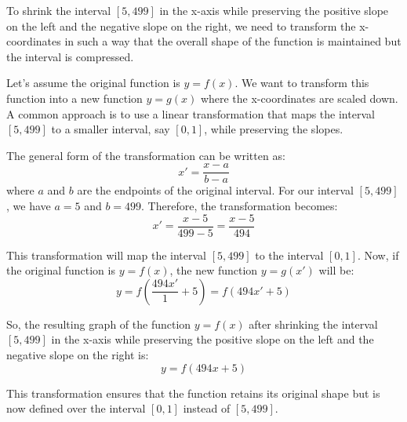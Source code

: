 To shrink the interval \([5, 499]\) in the x-axis while preserving the positive slope on the left and the negative slope on the right, we need to transform the x-coordinates in such a way that the overall shape of the function is maintained but the interval is compressed.

Let's assume the original function is \(y = f(x)\). We want to transform this function into a new function \(y = g(x)\) where the x-coordinates are scaled down. A common approach is to use a linear transformation that maps the interval \([5, 499]\) to a smaller interval, say \([0, 1]\), while preserving the slopes.

The general form of the transformation can be written as:
\[ x' = \frac{x - a}{b - a} \]
where \(a\) and \(b\) are the endpoints of the original interval. For our interval \([5, 499]\), we have \(a = 5\) and \(b = 499\). Therefore, the transformation becomes:
\[ x' = \frac{x - 5}{499 - 5} = \frac{x - 5}{494} \]

This transformation will map the interval \([5, 499]\) to the interval \([0, 1]\). Now, if the original function is \(y = f(x)\), the new function \(y = g(x')\) will be:
\[ y = f\left(\frac{494x'}{1} + 5\right) = f(494x' + 5) \]

So, the resulting graph of the function \(y = f(x)\) after shrinking the interval \([5, 499]\) in the x-axis while preserving the positive slope on the left and the negative slope on the right is:
\[ \boxed{y = f(494x + 5)} \]

This transformation ensures that the function retains its original shape but is now defined over the interval \([0, 1]\) instead of \([5, 499]\).